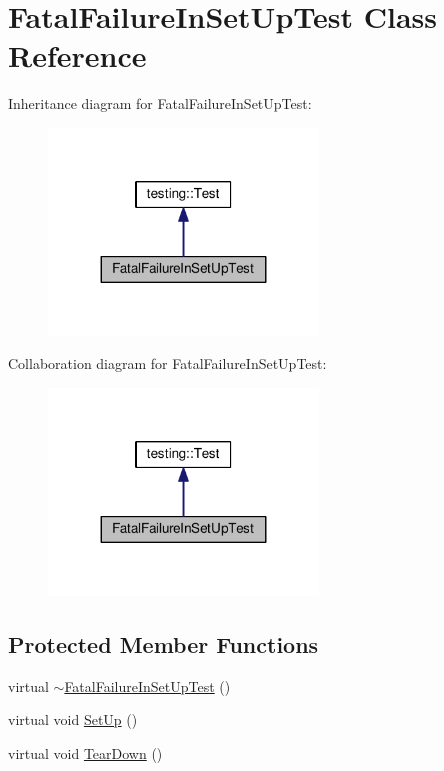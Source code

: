 \hypertarget{classFatalFailureInSetUpTest}{}\section{Fatal\+Failure\+In\+Set\+Up\+Test Class Reference}
\label{classFatalFailureInSetUpTest}


Inheritance diagram for Fatal\+Failure\+In\+Set\+Up\+Test\+:
\nopagebreak
\begin{figure}[H]
\begin{center}
\leavevmode
\includegraphics[width=203pt]{classFatalFailureInSetUpTest__inherit__graph}
\end{center}
\end{figure}


Collaboration diagram for Fatal\+Failure\+In\+Set\+Up\+Test\+:
\nopagebreak
\begin{figure}[H]
\begin{center}
\leavevmode
\includegraphics[width=203pt]{classFatalFailureInSetUpTest__coll__graph}
\end{center}
\end{figure}
\subsection*{Protected Member Functions}
\begin{DoxyCompactItemize}
\item 
virtual \hyperlink{classFatalFailureInSetUpTest_a915ca362b046259c3586c1ab72bb0a93}{$\sim$\+Fatal\+Failure\+In\+Set\+Up\+Test} ()
\item 
virtual void \hyperlink{classFatalFailureInSetUpTest_a455696f86fb5f5393624221ccb79b373}{Set\+Up} ()
\item 
virtual void \hyperlink{classFatalFailureInSetUpTest_a457707161063e08f7b6600ec5db449e4}{Tear\+Down} ()
\end{DoxyCompactItemize}
